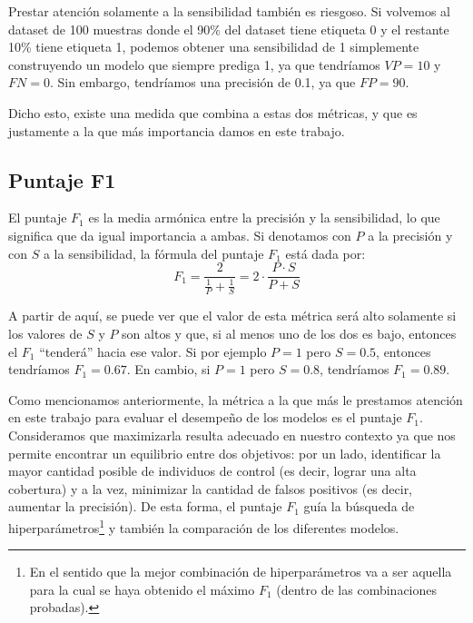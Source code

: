 \documentclass[../../main.tex]{subfiles}
\begin{document}
Prestar atención solamente a la sensibilidad también es riesgoso. Si volvemos al dataset
de 100 muestras donde el 90\% del dataset tiene etiqueta 0 y el restante 10\% tiene
etiqueta 1, podemos obtener una sensibilidad de 1 simplemente construyendo un modelo que
siempre prediga 1, ya que tendríamos \(VP=10\) y \(FN=0\). Sin embargo, tendríamos
una precisión de 0.1, ya que \(FP=90\).

Dicho esto, existe una medida que combina a estas dos métricas, y que es justamente a la
que más importancia damos en este trabajo.

\subsection{Puntaje F1}
El puntaje \(F_1\) es la media armónica entre la precisión y la sensibilidad, lo que significa
que da igual importancia a ambas. Si denotamos con \(P\) a la precisión y con \(S\) a la
sensibilidad, la fórmula del puntaje \(F_1\) está dada por:
\[
    F_1 = \frac{2}{\frac{1}{P} + \frac{1}{S}} = 2 \cdot \frac{P \cdot S}{P + S}
\]

A partir de aquí, se puede ver que el valor de esta métrica será alto solamente si los
valores de \(S\) y \(P\) son altos y que, si al menos uno de los dos es bajo, entonces el
\(F_1\) ``tenderá'' hacia ese valor. Si por ejemplo \(P=1\) pero \(S=0.5\), entonces
tendríamos \(F_1 = 0.67\). En cambio, si \(P=1\) pero \(S=0.8\), tendríamos \(F_1 =
0.89\).

\bigskip
Como mencionamos anteriormente, la métrica a la que más le prestamos atención en este
trabajo para evaluar el desempeño de los modelos es el puntaje \(F_1\). Consideramos que
maximizarla resulta adecuado en nuestro contexto ya que nos permite encontrar un
equilibrio entre dos objetivos: por un lado, identificar la mayor cantidad posible de
individuos de control (es decir, lograr una alta cobertura) y a la vez, minimizar la
cantidad de falsos positivos (es decir, aumentar la precisión). De esta forma, el puntaje
\(F_1\) guía la búsqueda de hiperparámetros\footnote{En el sentido que la mejor
combinación de hiperparámetros va a ser aquella para la cual se haya obtenido el máximo
\(F_1\) (dentro de las combinaciones probadas).} y también la comparación de los
diferentes modelos.
\end{document}

